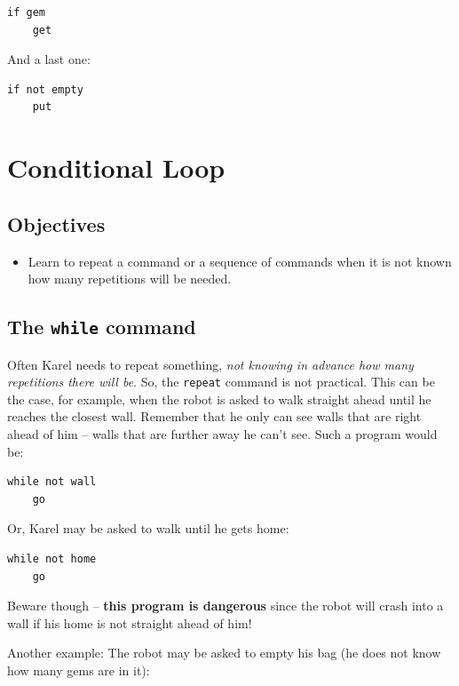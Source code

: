 \begin{verbatim}
if gem
    get
\end{verbatim}
And a last one:
 
\begin{verbatim}
if not empty
    put
\end{verbatim}


\section{Conditional Loop} \label{sec:whilek}

\subsection{Objectives} 
 
\begin{itemize}
\item Learn to repeat a command or a sequence of commands when it is not known 
      how many repetitions will be needed.
\end{itemize}

\subsection{The {\tt while} command}

Often Karel needs to repeat something, {\em not knowing in advance how many repetitions
there will be}. So, the {\tt repeat} command is not practical. This can be the case, for example, 
when the robot is asked to walk straight ahead until he reaches the closest wall.
Remember that he only can see walls that are right ahead of him -- walls 
that are further away he can't see. Such a program would be:

\begin{verbatim}
while not wall
    go
\end{verbatim}
Or, Karel may be asked to walk until he gets home:

\begin{verbatim}
while not home
    go
\end{verbatim}
Beware though -- {\bf this program is dangerous} since the robot will crash into a wall
if his home is not straight ahead of him!

Another example: The robot may be asked to empty his bag (he does not know how many gems are in it): 
 
